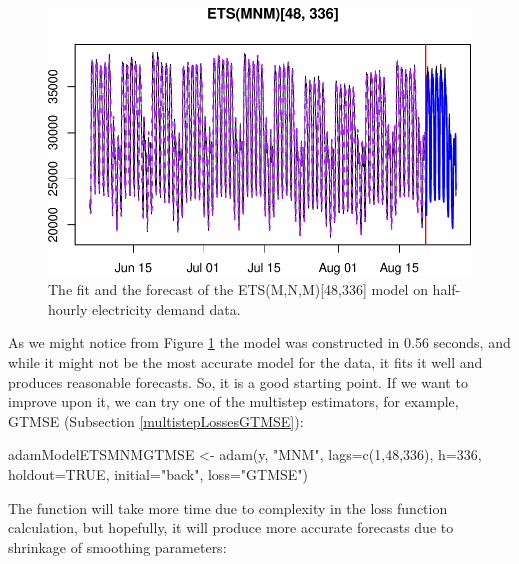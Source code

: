 \documentclass[
]{book}
\newenvironment{Shaded}{\begin{snugshade}}{\end{snugshade}}
\newcommand{\AttributeTok}[1]{\textcolor[rgb]{0.77,0.63,0.00}{#1}}
\newcommand{\ConstantTok}[1]{\textcolor[rgb]{0.00,0.00,0.00}{#1}}
\newcommand{\DecValTok}[1]{\textcolor[rgb]{0.00,0.00,0.81}{#1}}
\newcommand{\FunctionTok}[1]{\textcolor[rgb]{0.00,0.00,0.00}{#1}}
\newcommand{\NormalTok}[1]{#1}
\newcommand{\OtherTok}[1]{\textcolor[rgb]{0.56,0.35,0.01}{#1}}
\newcommand{\StringTok}[1]{\textcolor[rgb]{0.31,0.60,0.02}{#1}}
\theoremstyle{definition}
\theoremstyle{definition}
\theoremstyle{definition}
\theoremstyle{definition}
\theoremstyle{remark}
\begin{document}
\begin{figure}
\centering
\includegraphics{Svetunkov--2022----ADAM_files/figure-latex/adamModelETSMNM-1.pdf}
\caption{\label{fig:adamModelETSMNM}The fit and the forecast of the ETS(M,N,M){[}48,336{]} model on half-hourly electricity demand data.}
\end{figure}

As we might notice from Figure \ref{fig:adamModelETSMNM} the model was constructed in 0.56 seconds, and while it might not be the most accurate model for the data, it fits it well and produces reasonable forecasts. So, it is a good starting point. If we want to improve upon it, we can try one of the multistep estimators, for example, GTMSE (Subsection \ref{multistepLossesGTMSE}):

\begin{Shaded}
\begin{Highlighting}[]
\NormalTok{adamModelETSMNMGTMSE }\OtherTok{\textless{}{-}} \FunctionTok{adam}\NormalTok{(y, }\StringTok{"MNM"}\NormalTok{, }\AttributeTok{lags=}\FunctionTok{c}\NormalTok{(}\DecValTok{1}\NormalTok{,}\DecValTok{48}\NormalTok{,}\DecValTok{336}\NormalTok{),}
                             \AttributeTok{h=}\DecValTok{336}\NormalTok{, }\AttributeTok{holdout=}\ConstantTok{TRUE}\NormalTok{,}
                             \AttributeTok{initial=}\StringTok{"back"}\NormalTok{, }\AttributeTok{loss=}\StringTok{"GTMSE"}\NormalTok{)}
\end{Highlighting}
\end{Shaded}

The function will take more time due to complexity in the loss function calculation, but hopefully, it will produce more accurate forecasts due to shrinkage of smoothing parameters:
\end{document}
